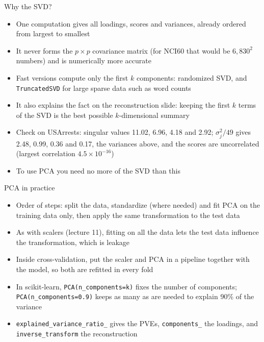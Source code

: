 \begin{frame}{Why the SVD?}
    \begin{itemize}
        \item One computation gives all loadings, scores and variances, already ordered from largest to smallest
        \item It never forms the $p \times p$ covariance matrix (for NCI60 that would be $6{,}830^2$ numbers) and is numerically more accurate
        \item Fast versions compute only the first $k$ components: randomized SVD, and \texttt{TruncatedSVD} for large sparse data such as word counts
        \item It also explains the fact on the reconstruction slide: keeping the first $k$ terms of the SVD is the best possible $k$-dimensional summary
        \item Check on USArrests: singular values 11.02, 6.96, 4.18 and 2.92; $\sigma_j^2 / 49$ gives 2.48, 0.99, 0.36 and 0.17, the variances above, and the scores are uncorrelated (largest correlation $4.5 \times 10^{-16}$)
        \item To use PCA you need no more of the SVD than this
    \end{itemize}
\end{frame}

\begin{frame}{PCA in practice}
    \begin{itemize}
        \item Order of steps: split the data, standardize (where needed) and fit PCA on the training data only, then apply the same transformation to the test data
        \item As with scalers (lecture 11), fitting on all the data lets the test data influence the transformation, which is leakage
        \item Inside cross-validation, put the scaler and PCA in a pipeline together with the model, so both are refitted in every fold
        \item In scikit-learn, \texttt{PCA(n\_components=k)} fixes the number of components; \texttt{PCA(n\_components=0.9)} keeps as many as are needed to explain 90\% of the variance
        \item \texttt{explained\_variance\_ratio\_} gives the PVEs, \texttt{components\_} the loadings, and \texttt{inverse\_transform} the reconstruction
    \end{itemize}
\end{frame}


